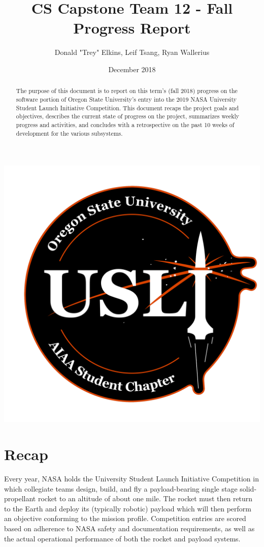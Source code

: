 \documentclass[journal,10pt,draftclsnofoot,onecolumn,compsoc]{IEEEtran} \usepackage[margin=0.75in]{geometry}
\title{CS Capstone Team 12 - Fall Progress Report}
\author{Donald "Trey" Elkins, Leif Tsang, Ryan Wallerius}
\date{December 2018}
\begin{document}
\begin{titlingpage}

\maketitle
\begin{center}

\includegraphics[scale = 0.5]{osu_usli_logo.png}\\[1.0 cm]
\end{center}
\begin{abstract}
The purpose of this document is to report on this term's (fall 2018) progress on the software portion of Oregon State University's entry into the 2019 NASA University Student Launch Initiative Competition. This document recaps the project goals and objectives, describes the current state of progress on the project, summarizes weekly progress and activities, and concludes with a retrospective on the past 10 weeks of development for the various subsystems. 
\end{abstract}
\end{titlingpage}

\section{Recap}
Every year, NASA holds the University Student Launch Initiative Competition in which collegiate teams design, build, and fly a payload-bearing single stage solid-propellant rocket to an altitude of about one mile. The rocket must then return to the Earth and deploy its (typically robotic) payload which will then perform an objective conforming to the mission profile. Competition entries are scored based on adherence to NASA safety and documentation requirements, as well as the actual operational performance of both the rocket and payload systems. \newline
\end{document}
